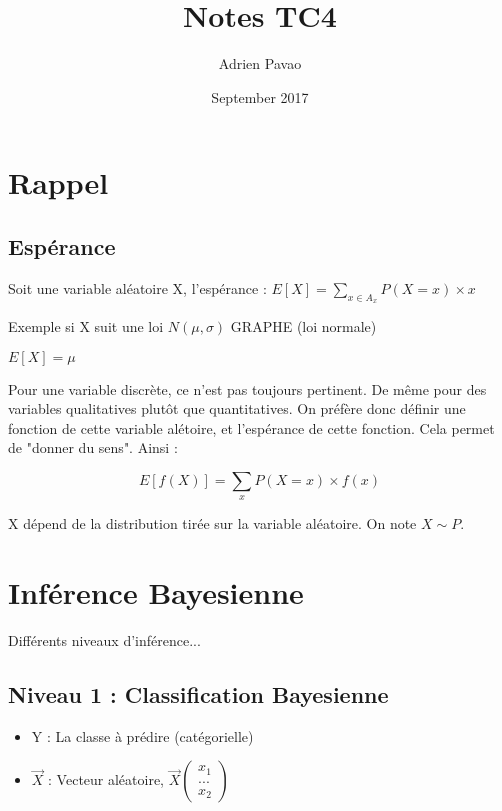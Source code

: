 \documentclass{article}
\title{Notes TC4}
\author{Adrien Pavao}
\date{September 2017}
\begin{document}
\maketitle

\tableofcontents

\section{Rappel}

\subsection{Espérance}

Soit une variable aléatoire X, l'espérance : $E[X] = \sum_{x \in A_x} P(X = x) \times x$

Exemple si X suit une loi $N(\mu, \sigma)$ GRAPHE (loi normale)

$E[X] = \mu$

Pour une variable discrète, ce n'est pas toujours pertinent. De même pour des variables qualitatives plutôt que quantitatives. On préfère donc définir une fonction de cette variable alétoire, et l'espérance de cette fonction. Cela permet de "donner du sens". Ainsi :

\[ E[f(X)] = \sum_x P(X = x) \times f(x) \]

X dépend de la distribution tirée sur la variable aléatoire. On note $X \sim P$.

\section{Inférence Bayesienne}

Différents niveaux d'inférence...

\subsection{Niveau 1 : Classification Bayesienne}

\begin{itemize}
\item Y : La classe à prédire (catégorielle)
\item $\vec{X}$ : Vecteur aléatoire, \( \vec{X} 
\begin{pmatrix} 
      x_1\\ 
      ...\\
      x_2 
\end{pmatrix} \)

\end{itemize}
\end{document}
